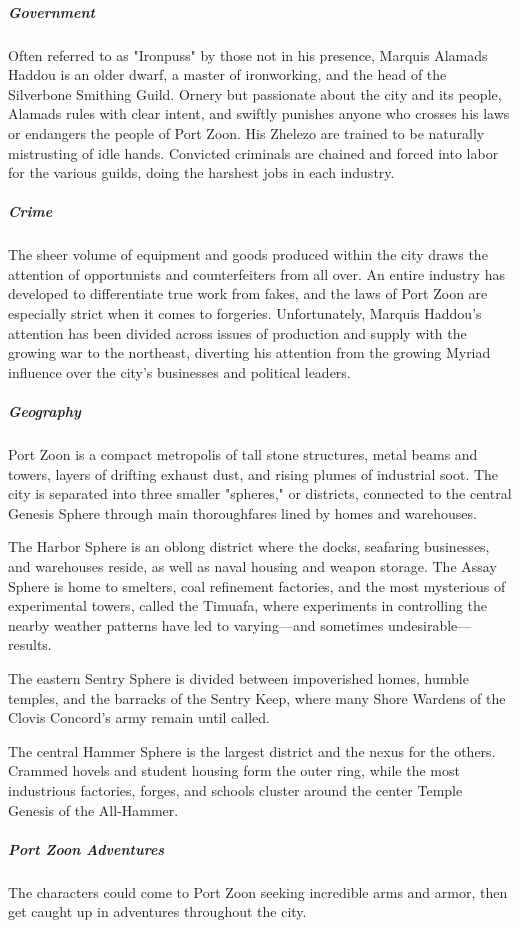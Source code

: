 \documentclass[10pt,a4paper,twoside,bg=print,twocolumn,openany,nodeprecatedcode]{dndbook}
\begin{document}
\subparagraph{Government}
Often referred to as "Ironpuss" by those not in his presence, Marquis Alamads Haddou is an older dwarf, a master of ironworking, and the head of the Silverbone Smithing Guild. Ornery but passionate about the city and its people, Alamads rules with clear intent, and swiftly punishes anyone who crosses his laws or endangers the people of Port Zoon. His Zhelezo are trained to be naturally mistrusting of idle hands. Convicted criminals are chained and forced into labor for the various guilds, doing the harshest jobs in each industry.

\subparagraph{Crime}
The sheer volume of equipment and goods produced within the city draws the attention of opportunists and counterfeiters from all over. An entire industry has developed to differentiate true work from fakes, and the laws of Port Zoon are especially strict when it comes to forgeries. Unfortunately, Marquis Haddou's attention has been divided across issues of production and supply with the growing war to the northeast, diverting his attention from the growing Myriad influence over the city's businesses and political leaders.

\subparagraph{Geography}
Port Zoon is a compact metropolis of tall stone structures, metal beams and towers, layers of drifting exhaust dust, and rising plumes of industrial soot. The city is separated into three smaller "spheres," or districts, connected to the central Genesis Sphere through main thoroughfares lined by homes and warehouses.

The Harbor Sphere is an oblong district where the docks, seafaring businesses, and warehouses reside, as well as naval housing and weapon storage. The Assay Sphere is home to smelters, coal refinement factories, and the most mysterious of experimental towers, called the Timuafa, where experiments in controlling the nearby weather patterns have led to varying—and sometimes undesirable—results.

The eastern Sentry Sphere is divided between impoverished homes, humble temples, and the barracks of the Sentry Keep, where many Shore Wardens of the Clovis Concord's army remain until called.

The central Hammer Sphere is the largest district and the nexus for the others. Crammed hovels and student housing form the outer ring, while the most industrious factories, forges, and schools cluster around the center Temple Genesis of the All-Hammer.

\subparagraph{Port Zoon Adventures}
The characters could come to Port Zoon seeking incredible arms and armor, then get caught up in adventures throughout the city.
\end{document}
